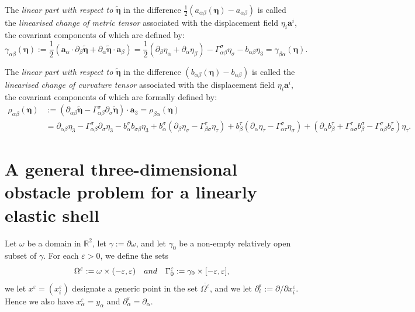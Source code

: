 \documentclass{amsart}
\begin{document}
The \emph{linear part with  respect to} $\tilde{\bm{\eta}}$ in the difference $\frac{1}{2}(a_{\alpha\beta}(\bm{\eta}) - a_{\alpha\beta})$ is called the \emph{linearised change of metric tensor} associated with the displacement field $\eta_i \bm{a}^i$, the covariant components of which are defined by:
$$
\gamma_{\alpha\beta}(\bm{\eta}) := \dfrac{1}{2} \left(\bm{a}_\alpha \cdot \partial_\beta \tilde{\bm{\eta}} + \partial_\alpha \tilde{\bm{\eta}} \cdot \bm{a}_\beta\right) = \dfrac{1}{2}(\partial_\beta \eta_\alpha + \partial_\alpha \eta_\beta ) - \Gamma^\sigma_{\alpha\beta} \eta_\sigma - b_{\alpha\beta} \eta_3 = \gamma_{\beta\alpha} (\bm{\eta}).
$$

The \emph{linear part with  respect to} $\tilde{\bm{\eta}}$ in the difference $(b_{\alpha\beta}(\bm{\eta}) - b_{\alpha\beta})$ is called the \emph{linearised change of curvature tensor} associated with the displacement field $\eta_i \bm{a}^i$, the covariant components of which are formally defined by:
\begin{align*}
\rho_{\alpha\beta}(\bm{\eta}) &:= (\partial_{\alpha\beta}\tilde{\bm{\eta}}-\Gamma_{\alpha\beta}^\sigma \partial_\sigma \tilde{\bm{\eta}})\cdot \bm{a}_3 = \rho_{\beta\alpha}(\bm{\eta})\\
&= \partial_{\alpha\beta}\eta_3 -\Gamma_{\alpha\beta}^\sigma \partial_\sigma\eta_3 -b_\alpha^\sigma b_{\sigma\beta}\eta_3
+b_\alpha^\sigma(\partial_\beta \eta_\sigma-\Gamma_{\beta\sigma}^\tau\eta_\tau)+b_\beta^\tau(\partial_\alpha\eta_\tau-\Gamma_{\alpha\tau}^\sigma\eta_\sigma)
+(\partial_\alpha b_\beta^\tau+\Gamma_{\alpha\sigma}^\tau b_\beta^\sigma-\Gamma_{\alpha\beta}^\sigma b_\sigma^\tau)\eta_\tau.
\end{align*}

\section{A general three-dimensional obstacle problem for a linearly elastic shell} \label{Sec:2}

Let $\omega$ be a domain in $\mathbb{R}^2$, let $\gamma:= \partial \omega$, and let $\gamma_0$ be a non-empty relatively open subset of $\gamma$. For each $\varepsilon > 0$, we define the sets
$$
\Omega^\varepsilon := \omega \times (- \varepsilon , \varepsilon) \quad \textup{ and } \quad \Gamma^\varepsilon_0 := \gamma_0 \times [-\varepsilon,\varepsilon],
$$
we let $x^\varepsilon = (x^\varepsilon_i)$ designate a generic point in the set $\overline{\Omega^\varepsilon}$, and we let $\partial^\varepsilon_i := \partial / \partial x^\varepsilon_i$. Hence we also have $x^\varepsilon_\alpha = y_\alpha$ and $\partial^\varepsilon_\alpha = \partial_\alpha$.
\end{document}
